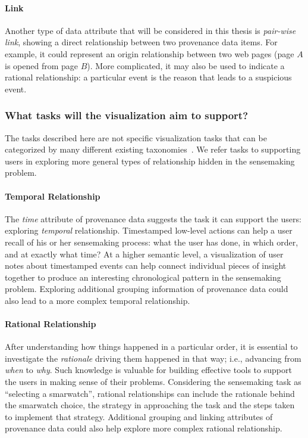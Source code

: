 \paragraph{Link}
Another type of data attribute that will be considered in this thesis is \emph{pair-wise link}, showing a direct relationship between two provenance data items. For example, it could represent an origin relationship between two web pages (page $A$ is opened from page $B$). More complicated, it may also be used to indicate a rational relationship: a particular event is the reason that leads to a suspicious event.

\subsubsection*{What tasks will the visualization aim to support?}
The tasks described here are not specific visualization tasks that can be categorized by many different existing taxonomies~\cite{Amar2005, Yi2007, Brehmer2013}. We refer tasks to supporting users in exploring more general types of relationship hidden in the sensemaking problem.

\paragraph{Temporal Relationship}
The \emph{time} attribute of provenance data suggests the task it can support the users: exploring \emph{temporal} relationship. Timestamped low-level actions can help a user recall of his or her sensemaking process: what the user has done, in which order, and at exactly what time? At a higher semantic level, a visualization of user notes about timestamped events can help connect individual pieces of insight together to produce an interesting chronological pattern in the sensemaking problem. Exploring additional grouping information of provenance data could also lead to a more complex temporal relationship.

\paragraph{Rational Relationship}	
After understanding how things happened in a particular order, it is essential to investigate the \emph{rationale} driving them happened in that way; i.e., advancing from \emph{when} to \emph{why}. Such knowledge is valuable for building effective tools to support the users in making sense of their problems. Considering the sensemaking task as ``selecting a smarwatch'', rational relationships can include the rationale behind the smarwatch choice, the strategy in approaching the task and the steps taken to implement that strategy. Additional grouping and linking attributes of provenance data could also help explore more complex rational relationship.

